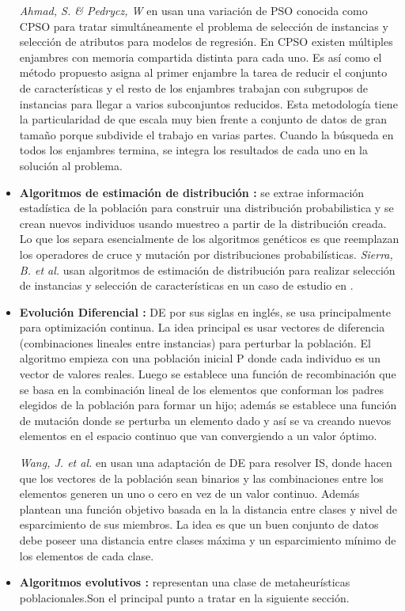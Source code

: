\begin{itemize}
\emph{Ahmad, S. \& Pedrycz, W} en \cite{ahmad2011feature} usan una variación de PSO conocida como CPSO para tratar simultáneamente el problema de selección de instancias y selección de atributos para modelos de regresión. En CPSO existen múltiples enjambres con memoria compartida distinta para cada uno. Es así como el método propuesto asigna al primer enjambre la tarea de reducir el conjunto de características y el resto de los enjambres trabajan con subgrupos de instancias para llegar a varios subconjuntos reducidos. Esta metodología tiene la particularidad de que escala muy bien frente a conjunto de datos de gran tamaño porque subdivide el trabajo en varias partes. Cuando la búsqueda en todos los enjambres termina, se integra los resultados de cada uno en la solución al problema.

\item \textbf{Algoritmos de estimación de distribución \cite{talbi2009metaheuristics,lozano2006towards}:}
se extrae información estadística de la población para construir una distribución probabilistica y se crean nuevos individuos usando muestreo a partir de la distribución creada. Lo que los separa esencialmente de los algoritmos genéticos es que reemplazan los operadores de cruce y mutación por distribuciones probabilísticas. \emph{Sierra, B. et al.} usan algoritmos de estimación de distribución para realizar selección de instancias y selección de características en un caso de estudio en \cite{sierra2001prototype}.

\item \textbf{Evolución Diferencial \cite{talbi2009metaheuristics,price2006differential}:}
DE por sus siglas en inglés, se usa principalmente para optimización continua. La idea principal es usar vectores de diferencia (combinaciones lineales entre instancias) para perturbar la población. El algoritmo empieza con una población inicial P donde cada individuo es un vector de valores reales. Luego se establece una función de recombinación que se basa en la combinación lineal de los elementos que conforman los padres elegidos de la población para formar un hijo; además se establece una función de mutación donde se perturba un elemento dado y así se va creando nuevos elementos en el espacio continuo que van convergiendo a un valor óptimo.

\emph{Wang, J. et al.} en \cite{wang2016differential} usan una adaptación de DE para resolver IS, donde hacen que los vectores de la población sean binarios y las combinaciones entre los elementos generen un uno o cero en vez de un valor continuo. Además plantean una función objetivo basada en la la distancia entre clases y nivel de esparcimiento de sus miembros. La idea es que un buen conjunto de datos debe poseer una distancia entre clases máxima y un esparcimiento mínimo de los elementos de cada clase.

\item \textbf{Algoritmos evolutivos \cite{talbi2009metaheuristics}:}
representan una clase de metaheurísticas poblacionales.Son el principal punto a tratar en la siguiente sección.
\end{itemize} 

